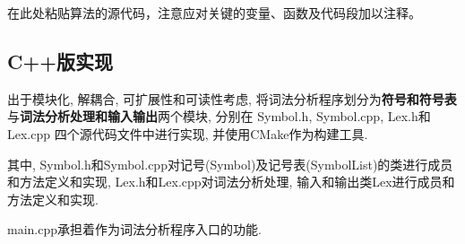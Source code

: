 在此处粘贴算法的源代码，注意应对关键的变量、函数及代码段加以注释。
\subsection{C++版实现}
出于模块化, 解耦合, 可扩展性和可读性考虑, 将词法分析程序划分为\textbf{符号和符号表}
与\textbf{词法分析处理和输入输出}两个模块, 分别在 Symbol.h, Symbol.cpp, Lex.h和Lex.cpp
四个源代码文件中进行实现, 并使用CMake作为构建工具.

其中, Symbol.h和Symbol.cpp对记号(Symbol)及记号表(SymbolList)的类进行成员和方法定义和实现,
 Lex.h和Lex.cpp对词法分析处理, 输入和输出类Lex进行成员和方法定义和实现.

main.cpp承担着作为词法分析程序入口的功能.

% 
% 
% 
% 
% 


